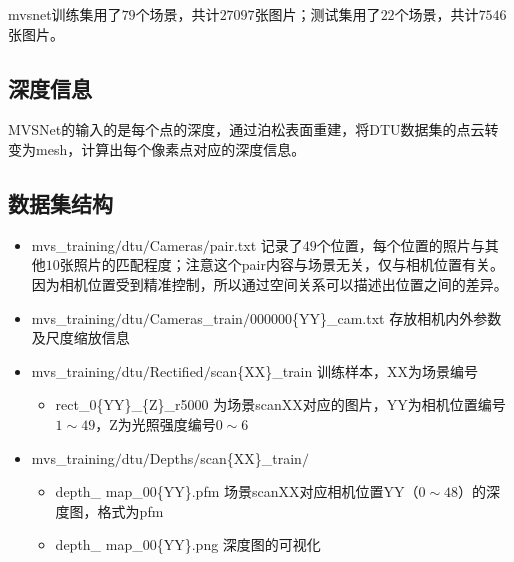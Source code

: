 		mvsnet训练集用了$79$个场景，共计$27097$张图片；测试集用了$22$个场景，共计$7546$张图片。
	
	\subsection*{深度信息}
		MVSNet的输入的是每个点的深度，通过泊松表面重建，将DTU数据集的点云转变为mesh，计算出每个像素点对应的深度信息。

	\subsection*{数据集结构}
		\begin{itemize}
			\item mvs{\_}training$\slash$dtu$\slash$Cameras$\slash$pair.txt 记录了$49$个位置，每个位置的照片与其他$10$张照片的匹配程度；注意这个pair内容与场景无关，仅与相机位置有关。因为相机位置受到精准控制，所以通过空间关系可以描述出位置之间的差异。

			\item mvs{\_}training$\slash$dtu$\slash$Cameras{\_}train$\slash$000000\{YY\}{\_}cam.txt 存放相机内外参数及尺度缩放信息

			\item mvs{\_}training$\slash$dtu$\slash$Rectified$\slash$scan\{XX\}{\_}train 训练样本，XX为场景编号
				\begin{itemize}
					\item rect{\_}0\{YY\}{\_}\{Z\}{\_}r5000 为场景scanXX对应的图片，YY为相机位置编号$ 1 \sim 49$，Z为光照强度编号$0 \sim 6$
				\end{itemize}

			\item mvs{\_}training$\slash$dtu$\slash$Depths$\slash$scan\{XX\}{\_}train$\slash$
				\begin{itemize}
					\item depth{\_} map{\_}00\{YY\}.pfm 场景scanXX对应相机位置YY（$0 \sim 48$）的深度图，格式为pfm
					\item depth{\_} map{\_}00\{YY\}.png 深度图的可视化
				\end{itemize}
			
		\end{itemize}	
